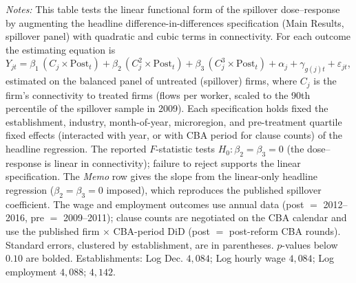 \begin{table}[H]
\begin{minipage}{\linewidth}
\textit{Notes:} This table tests the linear functional form of the spillover dose--response by augmenting the headline difference-in-differences specification (Main Results, spillover panel) with quadratic and cubic terms in connectivity. For each outcome the estimating equation is $Y_{jt} = \beta_1\,(C_j\!\times\!\text{Post}_t) + \beta_2\,(C_j^2\!\times\!\text{Post}_t) + \beta_3\,(C_j^3\!\times\!\text{Post}_t) + \alpha_j + \gamma_{g(j)t} + \varepsilon_{jt}$, estimated on the balanced panel of untreated (spillover) firms, where $C_j$ is the firm's connectivity to treated firms (flows per worker, scaled to the 90th percentile of the spillover sample in 2009). Each specification holds fixed the establishment, industry, month-of-year, microregion, and pre-treatment quartile fixed effects (interacted with year, or with CBA period for clause counts) of the headline regression. The reported $F$-statistic tests $H_0\!:\beta_2=\beta_3=0$ (the dose--response is linear in connectivity); failure to reject supports the linear specification. The \textit{Memo} row gives the slope from the linear-only headline regression ($\beta_2=\beta_3=0$ imposed), which reproduces the published spillover coefficient. The wage and employment outcomes use annual data (post $=$ 2012--2016, pre $=$ 2009--2011); clause counts are negotiated on the CBA calendar and use the published firm $\times$ CBA-period DiD (post $=$ post-reform CBA rounds). Standard errors, clustered by establishment, are in parentheses. $p$-values below $0.10$ are bolded. Establishments: Log Dec. $4{,}084$; Log hourly wage $4{,}084$; Log employment $4{,}088$;  $4{,}142$.
\end{minipage}
\end{table}

